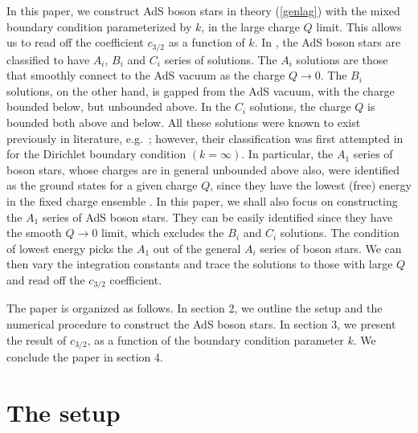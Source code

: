 \documentclass[11pt]{article}
\begin{document}
In this paper, we construct AdS boson stars in theory (\ref{genlag}) with the mixed boundary condition parameterized by $k$, in the large charge $Q$ limit.  This allows us to read off the coefficient $c_{3/2}$ as a function of $k$.  In \cite{Liu:2020uaz}, the AdS boson stars are classified to have $A_i$, $B_i$ and $C_i$ series of solutions.  The $A_i$ solutions are those that smoothly connect to the AdS vacuum as the charge $Q\rightarrow 0$.  The $B_i$ solutions, on the other hand, is gapped from the AdS vacuum, with the charge bounded below, but unbounded above.  In the $C_i$ solutions, the charge $Q$ is bounded both above and below.  All these solutions were known to exist previously in literature, e.g.~\cite{Gentle:2011kv}; however, their classification was first attempted in \cite{Liu:2020uaz} for the Dirichlet boundary condition $(k=\infty)$.  In particular, the $A_1$ series of boson stars, whose charges are in general unbounded above also, were identified as the ground states for a given charge $Q$, since they have the lowest (free) energy in the fixed charge ensemble \cite{Liu:2020uaz}. In this paper, we shall also focus on constructing the $A_1$ series of AdS boson stars. They can be easily identified since they have the smooth $Q\rightarrow 0$ limit, which excludes the $B_i$ and $C_i$ solutions.  The condition of lowest energy picks the $A_1$ out of the general $A_i$ series of boson stars.  We can then vary the integration constants and trace the solutions to those with large $Q$ and read off the $c_{3/2}$ coefficient.


The paper is organized as follows.  In section 2, we outline the setup and the numerical procedure to construct the AdS boson stars.  In section 3, we present the result of $c_{3/2}$, as a function of the boundary condition parameter $k$.  We conclude the paper in section 4.

\section{The setup}
\end{document}
